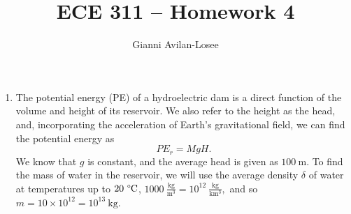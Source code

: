\documentclass{article}
\title{ECE 311 -- Homework 4}
\author{Gianni Avilan-Losee}
\begin{document}
\begin{enumerate}[label=\thesubsection]
	\setcounter{section}{4}
	\setcounter{subsection}{16}
	\item The potential energy (PE) of a hydroelectric dam is a direct function of the volume and height of its reservoir. We also refer to the height as the head, and, incorporating the acceleration of Earth's gravitational field, we can find the potential energy as 
		\[
			PE_{r} = MgH.
		\]
		We know that \(g\) is constant, and the average head is given as \(100\ \mathrm{m}\). To find the mass of water in the reservoir, we will use the average density \(\delta\) of water at temperatures up to \(20 \ \degree\mathrm{C}\), \(1000 \ \mathrm{\frac{kg}{m^3}} = 10^{12} \ \mathrm{\frac{kg}{km^3}},\) and so \(m = 10 \times 10^{12} = 10^{13} \ \mathrm{kg}\).


\end{enumerate}
\end{document}
